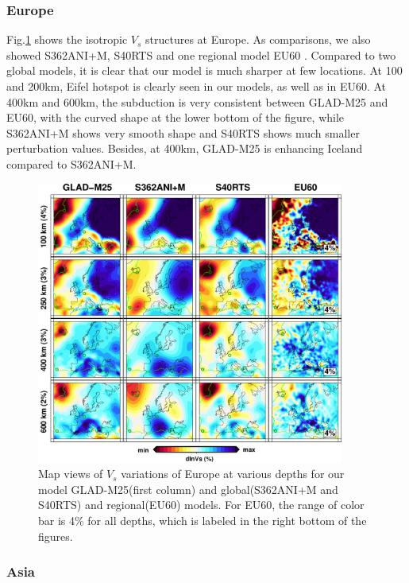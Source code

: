 \documentclass[extra,mreferee]{gji}
\begin{document}
\subsubsection{Europe}


Fig.\ref{fig:europe-vs} shows the isotropic $V_s$ structures at Europe. As
comparisons, we also showed S362ANI+M, S40RTS and one regional model EU60
\citep{zhu2015seismic}. Compared to two global models, it is clear that
our model is much sharper at few locations. At 100 and 200km, Eifel
hotspot is clearly seen in our models, as well as in EU60. At 400km
and 600km, the subduction is very consistent between GLAD-M25 and EU60,
with the curved shape at the lower bottom of the figure,
while S362ANI+M shows very smooth shape and S40RTS shows much smaller 
perturbation values. Besides, at 400km, GLAD-M25 is enhancing Iceland
compared to S362ANI+M.

\begin{figure}
\includegraphics[width=0.9\textwidth]{figures/depth_slice/europe_vs.pdf}
  \caption{Map views of $V_s$ variations of Europe at various depths for our
  model GLAD-M25(first column) and global(S362ANI+M and S40RTS) and
  regional(EU60\citep{zhu2015seismic}) models. For EU60, the range of color
  bar is 4\% for all depths, which is labeled in the right bottom of the figures.}
\label{fig:europe-vs}
\centering
\end{figure}

\subsubsection{Asia}
\end{document}
